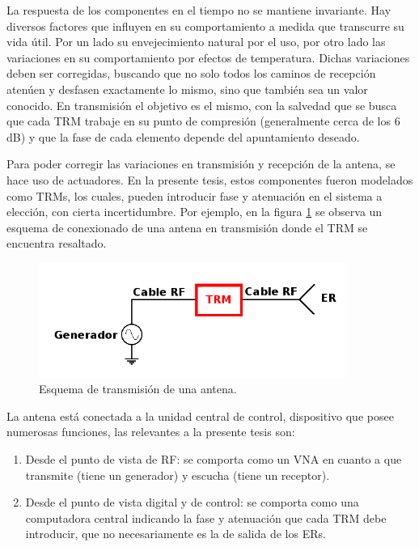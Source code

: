 La respuesta de los componentes en el tiempo no se mantiene invariante. Hay diversos factores que influyen en su comportamiento a
medida que transcurre su vida útil. Por un lado su envejecimiento natural por el uso, por otro lado las variaciones en su 
comportamiento por efectos de temperatura. Dichas variaciones deben ser corregidas, buscando que no solo todos
los caminos de recepción atenúen y desfasen exactamente lo mismo, sino que también sea un valor conocido. En transmisión el
objetivo es el mismo, con la salvedad que se busca que cada TRM trabaje en su punto de compresión (generalmente cerca de los
6 dB) y que la fase de cada elemento depende del apuntamiento deseado.

Para poder corregir las variaciones en transmisión y recepción de la antena, se hace uso de actuadores. En la presente tesis,
estos componentes fueron modelados como TRMs, los cuales, pueden introducir fase y atenuación en el sistema a elección, con
cierta incertidumbre. Por ejemplo, en la figura \ref{fig:antennaTRM} se observa un esquema 
de conexionado de una antena en transmisión donde el TRM se encuentra resaltado.

\begin{figure}[H]
 \centering
 \includegraphics[width=10cm]{gfx/antennaTRM.png}
 \caption{Esquema de transmisión de una antena.}
 \label{fig:antennaTRM}
\end{figure}

La antena está conectada a la unidad central de control, dispositivo que posee numerosas funciones, las relevantes a la presente tesis 
son:
\begin{enumerate}
	\item Desde el punto de vista de RF: se comporta como un VNA en cuanto a que transmite (tiene un generador) y escucha (tiene un
		receptor).
	\item Desde el punto de vista digital y de control: se comporta como una computadora central indicando la fase y atenuación que
		cada TRM debe introducir, que no necesariamente es la de salida de los ERs.
\end{enumerate}

